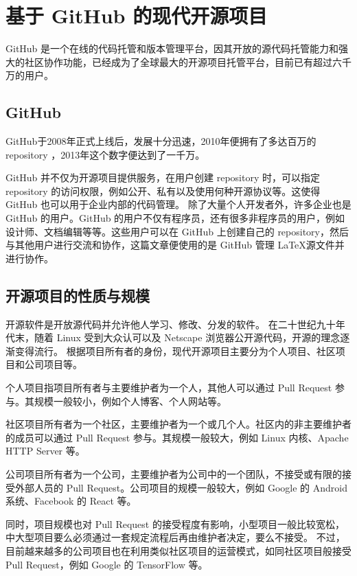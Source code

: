 \documentclass[../main.tex]{subfiles}
\begin{document}
\section{基于 GitHub 的现代开源项目}

GitHub 是一个在线的代码托管和版本管理平台，因其开放的源代码托管能力和强大的社区协作功能，已经成为了全球最大的开源项目托管平台，目前已有超过六千万的用户。

\subsection{GitHub}

GitHub于2008年正式上线后，发展十分迅速，2010年便拥有了多达百万的 repository \cite{github_million}，2013年这个数字便达到了一千万\cite{github_ten_million}。

GitHub 并不仅为开源项目提供服务，在用户创建 repository 时，可以指定 repository 的访问权限，例如公开、私有以及使用何种开源协议等。这使得 GitHub 也可以用于企业内部的代码管理。
除了大量个人开发者外，许多企业也是 GitHub 的用户。GitHub 的用户不仅有程序员，还有很多非程序员的用户，例如设计师、文档编辑等等。这些用户可以在 GitHub 上创建自己的 repository，然后与其他用户进行交流和协作，这篇文章便使用的是 GitHub 管理 \LaTeX 源文件并进行协作。

\subsection{开源项目的性质与规模}

开源软件是开放源代码并允许他人学习、修改、分发的软件。
在二十世纪九十年代末，随着 Linux 受到大众认可以及 Netscape 浏览器公开源代码，开源的理念逐渐变得流行\cite{opensource}。
根据项目所有者的身份，现代开源项目主要分为个人项目、社区项目和公司项目等。

个人项目指项目所有者与主要维护者为一个人，其他人可以通过 Pull Request 参与。其规模一般较小，例如个人博客、个人网站等。

社区项目所有者为一个社区，主要维护者为一个或几个人。社区内的非主要维护者的成员可以通过 Pull Request 参与。其规模一般较大，例如 Linux 内核、Apache HTTP Server 等。

公司项目所有者为一个公司，主要维护者为公司中的一个团队，不接受或有限的接受外部人员的 Pull Request。公司项目的规模一般较大，例如 Google 的 Android 系统、Facebook 的 React 等。

同时，项目规模也对 Pull Request 的接受程度有影响，小型项目一般比较宽松，中大型项目要么必须通过一套规定流程后再由维护者决定，要么不接受。
不过，目前越来越多的公司项目也在利用类似社区项目的运营模式，如同社区项目般接受 Pull Request，例如 Google 的 TensorFlow 等。
\end{document}
